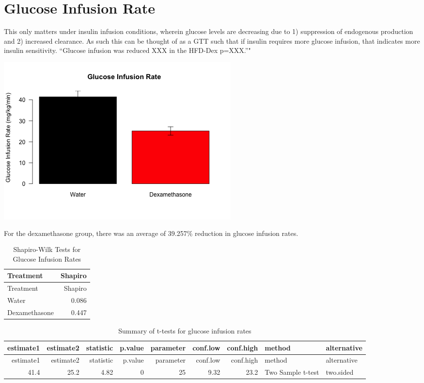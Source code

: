 \documentclass[]{article}
\begin{document}
\section{Glucose Infusion Rate}\label{glucose-infusion-rate}

This only matters under insulin infusion conditions, wherein glucose
levels are decreasing due to 1) suppression of endogenous production and
2) increased clearance. As such this can be thought of as a GTT such
that if insulin requires more glucose infusion, that indicates more
insulin sensitivity. ``Glucose infusion was reduced XXX in the HFD-Dex
p=XXX.''"

\includegraphics{figures/gir-barplot-hfd-1.png}

For the dexamethasone group, there was an average of 39.257\% reduction
in glucose infusion rates.

\begin{longtable}[]{@{}lr@{}}
\caption{Shapiro-Wilk Tests for Glucose Infusion Rates}\tabularnewline
\toprule
Treatment & Shapiro\tabularnewline
\midrule
\endfirsthead
\toprule
Treatment & Shapiro\tabularnewline
\midrule
\endhead
Water & 0.086\tabularnewline
Dexamethasone & 0.447\tabularnewline
\bottomrule
\end{longtable}

\begin{longtable}[]{@{}rrrrrrrll@{}}
\caption{Summary of t-tests for glucose infusion rates}\tabularnewline
\toprule
estimate1 & estimate2 & statistic & p.value & parameter & conf.low &
conf.high & method & alternative\tabularnewline
\midrule
\endfirsthead
\toprule
estimate1 & estimate2 & statistic & p.value & parameter & conf.low &
conf.high & method & alternative\tabularnewline
\midrule
\endhead
41.4 & 25.2 & 4.82 & 0 & 25 & 9.32 & 23.2 & Two Sample t-test &
two.sided\tabularnewline
\bottomrule
\end{longtable}
\end{document}
